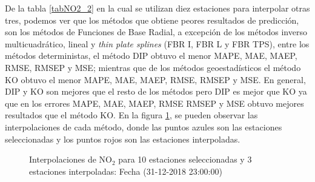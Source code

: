De la tabla \ref{tabNO2_2} en la cual se utilizan diez estaciones para interpolar otras tres, podemos ver que los métodos que obtiene peores resultados de predicción, son los métodos de Funciones de Base Radial, a excepción de los métodos inverso multicuadrático, lineal y {\em thin plate splines} (FBR I,  FBR L y FBR TPS), entre los métodos deterministas, el método DIP obtuvo el menor MAPE, MAE, MAEP, RMSE, RMSEP y MSE; mientras que de los métodos geoestadísticos el método KO obtuvo el menor MAPE, MAE, MAEP, RMSE, RMSEP y MSE. En general, DIP y KO son mejores que el resto de los métodos pero DIP es mejor que KO ya que en los errores MAPE, MAE, MAEP, RMSE RMSEP y MSE obtuvo mejores resultados que el método KO. En la figura \ref{NO2figure2}, se pueden observar las interpolaciones de cada método, donde las puntos azules son las estaciones seleccionadas y los puntos rojos son las estaciones interpoladas.


\begin{figure}[H]
\centering
{}
\subfigure[KO] {\texttt{[image: ./ok\_10\_2\_26302]}}
\subfigure[KU] {\texttt{[image: ./uk\_10\_2\_26302]}}
\caption{Interpolaciones de NO$_{2}$ para 10 estaciones seleccionadas y 3 estaciones interpoladas: Fecha (31-12-2018 23:00:00)}
\label{NO2figure2}
\end{figure}


